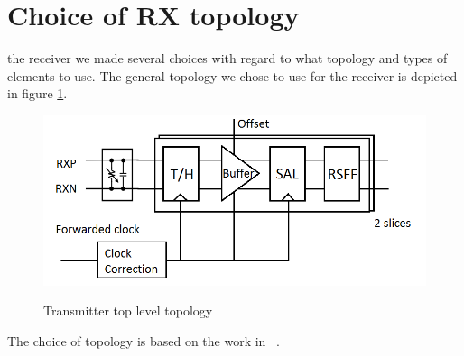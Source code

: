 \section{Choice of RX topology}

 the receiver we made several choices with regard to what topology and types of elements to use. The general topology we chose to use for the receiver is depicted in figure \ref{fig:topology}.

\begin{figure}[H]
  \centering
  {\includegraphics[scale=0.55]{img/topology.png}}
  \caption{Transmitter top level topology}
  \label{fig:topology}
\end{figure}

The choice of topology is based on the work in ~\cite{mahony2010a}. 

